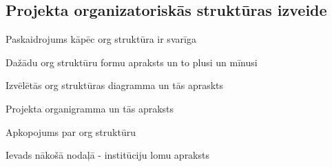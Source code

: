 \subsection{Projekta organizatoriskās struktūras izveide}
Paskaidrojums kāpēc org struktūra ir svarīga
\par
Dažādu org struktūru formu apraksts un to plusi un mīnusi
\par
Izvēlētās org struktūras diagramma un tās apraskts
\par
Projekta organigramma un tās apraksts
\par
Apkopojums par org struktūru
\par
Ievads nākošā nodaļā - institūciju lomu apraksts

